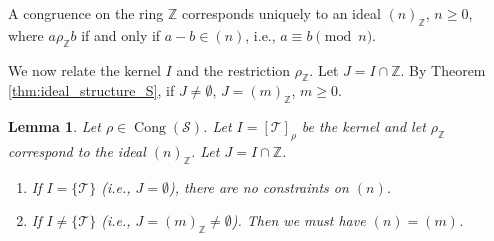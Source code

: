 \documentclass[11pt, a4paper]{article}
\theoremstyle{plain}
\newtheorem{lemma}[theorem]{Lemma}
\theoremstyle{definition}
\numberwithin{equation}{section}
\newcommand{\Z}{\mathbb{Z}}
\newcommand{\Tobj}{\mathcal{T}} %
\newcommand{\SemiringS}{\mathcal{S}}
\DeclareMathOperator{\Cong}{Cong}
\begin{document}
A congruence on the ring $\Z$ corresponds uniquely to an ideal $(n)_{\Z}$, $n\ge 0$, where $a \rho_{\Z} b$ if and only if $a-b \in (n)$, i.e., $a \equiv b \pmod{n}$.

We now relate the kernel $I$ and the restriction $\rho_{\Z}$. Let $J = I \cap \Z$. By Theorem \ref{thm:ideal_structure_S}, if $J\neq\emptyset$, $J=(m)_{\Z}$, $m\ge 0$.

\begin{lemma}\label{lem:congruence_constraints}
Let $\rho \in \Cong(\SemiringS)$. Let $I=[\Tobj]_{\rho}$ be the kernel and let $\rho_{\Z}$ correspond to the ideal $(n)_{\Z}$. Let $J=I\cap\Z$.
\begin{enumerate}
    \item If $I=\{\Tobj\}$ (i.e., $J=\emptyset$), there are no constraints on $(n)$.
    \item If $I\neq\{\Tobj\}$ (i.e., $J=(m)_{\Z} \neq \emptyset$). Then we must have $(n)=(m)$.
\end{enumerate}
\end{lemma}
\end{document}
